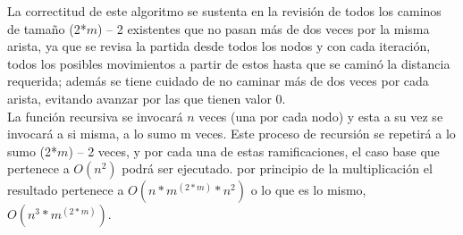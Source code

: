 \documentclass[a4paper,12pt,twocolumn]{article}
\begin{document}
	La correctitud de este algoritmo se sustenta en la revisión de todos los caminos de tamaño (2*$m$) – 2 existentes que no pasan más de dos veces por la misma arista, ya que se revisa la partida desde todos los nodos y con cada iteración, todos los posibles movimientos a partir de estos hasta que se caminó la distancia requerida; además se tiene cuidado de no caminar más de dos veces por cada arista, evitando avanzar por las que tienen valor 0.\\
	
	La función recursiva se invocará $n$ veces (una por cada nodo) y esta a su vez se invocará a si misma, a lo sumo m veces. Este proceso de recursión se repetirá a lo sumo (2*$m$) – 2 veces, y por cada una de estas ramificaciones, el caso base que pertenece a $O(n^2)$ podrá ser ejecutado. por principio de la multiplicación el resultado pertenece a $O(n * m^(2*m) * n^2)$ o lo que es lo mismo, $O(n^3 * m^(2*m))$. \\
\end{document}
